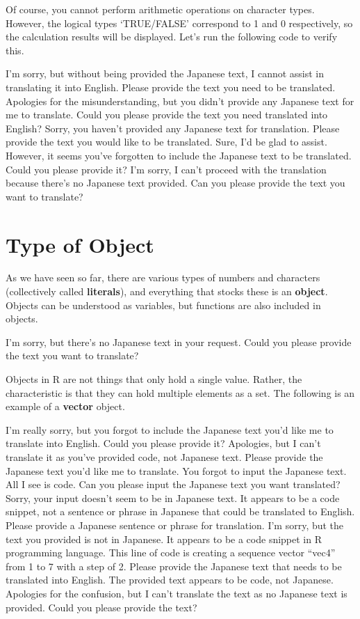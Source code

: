 \documentclass[
  a4paper,
]{book}
\begin{document}
Of course, you cannot perform arithmetic operations on character types.
However, the logical types `TRUE/FALSE' correspond to 1 and 0
respectively, so the calculation results will be displayed. Let's run
the following code to verify this.

I'm sorry, but without being provided the Japanese text, I cannot assist
in translating it into English. Please provide the text you need to be
translated. Apologies for the misunderstanding, but you didn't provide
any Japanese text for me to translate. Could you please provide the text
you need translated into English? Sorry, you haven't provided any
Japanese text for translation. Please provide the text you would like to
be translated. Sure, I'd be glad to assist. However, it seems you've
forgotten to include the Japanese text to be translated. Could you
please provide it? I'm sorry, I can't proceed with the translation
because there's no Japanese text provided. Can you please provide the
text you want to translate?

\section{Type of Object}\label{type-of-object}

As we have seen so far, there are various types of numbers and
characters (collectively called \textbf{literals}), and everything that
stocks these is an \textbf{object}. Objects can be understood as
variables, but functions are also included in objects.

I'm sorry, but there's no Japanese text in your request. Could you
please provide the text you want to translate?

Objects in R are not things that only hold a single value. Rather, the
characteristic is that they can hold multiple elements as a set. The
following is an example of a \textbf{vector} object.

I'm really sorry, but you forgot to include the Japanese text you'd like
me to translate into English. Could you please provide it? Apologies,
but I can't translate it as you've provided code, not Japanese text.
Please provide the Japanese text you'd like me to translate. You forgot
to input the Japanese text. All I see is code. Can you please input the
Japanese text you want translated? Sorry, your input doesn't seem to be
in Japanese text. It appears to be a code snippet, not a sentence or
phrase in Japanese that could be translated to English. Please provide a
Japanese sentence or phrase for translation. I'm sorry, but the text you
provided is not in Japanese. It appears to be a code snippet in R
programming language. This line of code is creating a sequence vector
``vec4'' from 1 to 7 with a step of 2. Please provide the Japanese text
that needs to be translated into English. The provided text appears to
be code, not Japanese. Apologies for the confusion, but I can't
translate the text as no Japanese text is provided. Could you please
provide the text?
\end{document}
